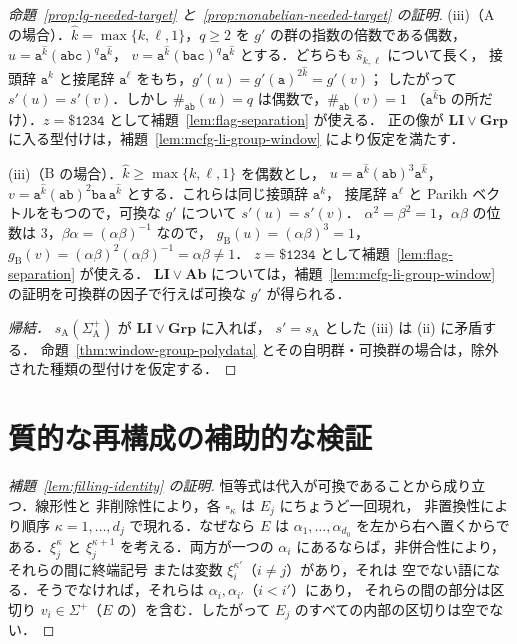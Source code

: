 \documentclass[11pt,a4paper]{ltjsarticle}
\numberwithin{equation}{section}
\theoremstyle{plain}
\theoremstyle{definition}
\theoremstyle{remark}
\newcommand{\blank}{\square}
\theoremstyle{plain}
\begin{document}
\begin{proof}[命題~\ref{prop:lg-needed-target} と~\ref{prop:nonabelian-needed-target} の証明]
(iii)（$\mathrm A$ の場合）．$\hat k=\max\{k,\ell,1\}$，$q\ge2$ を $g'$ の群の指数の倍数である偶数，
$u=\mathtt a^{\hat k}(\mathtt{abc})^q\mathtt a^{\hat k}$，
$v=\mathtt a^{\hat k}(\mathtt{bac})^q\mathtt a^{\hat k}$ とする．どちらも $\widehat s_{k,\ell}$ について長く，
接頭辞 $\mathtt a^k$ と接尾辞 $\mathtt a^\ell$ をもち，$g'(u)=g'(\mathtt a)^{2\hat k}=g'(v)$；
したがって $s'(u)=s'(v)$．しかし $\#_{\mathtt{ab}}(u)=q$ は偶数で，$\#_{\mathtt{ab}}(v)=1$
（$\mathtt a^{\hat k}\mathtt b$ の所だけ）．$z=\mathtt{\$1234}$ として補題~\ref{lem:flag-separation} が使える．
正の像が $\mathbf{LI}\vee\mathbf{Grp}$ に入る型付けは，補題~\ref{lem:mcfg-li-group-window} により仮定を満たす．

(iii)（$\mathrm B$ の場合）．$\hat k\ge\max\{k,\ell,1\}$ を偶数とし，
$u=\mathtt a^{\hat k}(\mathtt{ab})^3\mathtt a^{\hat k}$，
$v=\mathtt a^{\hat k}(\mathtt{ab})^2\mathtt{ba}\,\mathtt a^{\hat k}$ とする．これらは同じ接頭辞 $\mathtt a^k$，
接尾辞 $\mathtt a^\ell$ と Parikh ベクトルをもつので，可換な $g'$ について $s'(u)=s'(v)$．
$\alpha^2=\beta^2=1$，$\alpha\beta$ の位数は $3$，$\beta\alpha=(\alpha\beta)^{-1}$ なので，
$g_{\mathrm B}(u)=(\alpha\beta)^3=1$，$g_{\mathrm B}(v)=(\alpha\beta)^2(\alpha\beta)^{-1}=\alpha\beta\ne1$．
$z=\mathtt{\$1234}$ として補題~\ref{lem:flag-separation} が使える．
$\mathbf{LI}\vee\mathbf{Ab}$ については，補題~\ref{lem:mcfg-li-group-window} の証明を可換群の因子で行えば可換な $g'$ が得られる．

\emph{帰結．} $s_{\mathrm A}(\Sigma_{\mathrm A}^+)$ が $\mathbf{LI}\vee\mathbf{Grp}$ に入れば，
$s'=s_{\mathrm A}$ とした (iii) は (ii) に矛盾する．
命題~\ref{thm:window-group-polydata} とその自明群・可換群の場合は，除外された種類の型付けを仮定する．
\end{proof}

\section{質的な再構成の補助的な検証}
\label{app:qualitative-construction-details}

\begin{proof}[補題~\ref{lem:filling-identity} の証明]
恒等式は代入が可換であることから成り立つ．線形性と
非削除性により，各 $\blank_\kappa$ は $E_j$ にちょうど一回現れ，
非置換性により順序 $\kappa=1,\ldots,d_j$ で現れる．なぜなら $E$ は
$\alpha_1,\ldots,\alpha_{d_0}$ を左から右へ置くからである．$\xi_j^\kappa$ と
$\xi_j^{\kappa+1}$ を考える．両方が一つの $\alpha_i$ にあるならば，非併合性により，それらの間に終端記号
または変数 $\xi_i^{\kappa'}$（$i\ne j$）があり，それは
空でない語になる．そうでなければ，それらは $\alpha_i,\alpha_{i'}$（$i<i'$）にあり，
それらの間の部分は区切り $v_i\in\Sigma^+$（$E$ の）を含む．したがって
$E_j$ のすべての内部の区切りは空でない．
\end{proof}
\end{document}
